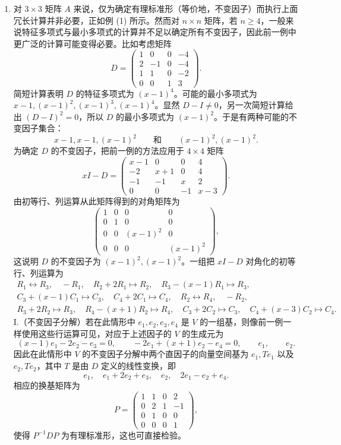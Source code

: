 \begin{enumerate}[label=(\arabic*)]
\item 对 $3\times3$ 矩阵 $A$ 来说，仅为确定有理标准形（等价地，不变因子）而执行上面冗长计算并非必要，正如例 (1) 所示。然而对 $n\times n$ 矩阵，若 $n\geq4$，一般来说特征多项式与最小多项式的计算并不足以确定所有不变因子，因此前一例中更广泛的计算可能变得必要。比如考虑矩阵
\[
D=\begin{pmatrix}
1&0&0&-4\\
2&-1&0&-4\\
1&1&0&-2\\
0&0&1&3
\end{pmatrix}.
\]
简短计算表明 $D$ 的特征多项式为 $(x-1)^4$。可能的最小多项式为 $x-1,(x-1)^2,(x-1)^3,(x-1)^4$。显然 $D-I\neq0$，另一次简短计算给出 $(D-I)^2=0$，所以 $D$ 的最小多项式为 $(x-1)^2$。于是有两种可能的不变因子集合：
\[
x-1,x-1,(x-1)^2
\qquad\text{和}\qquad
(x-1)^2,(x-1)^2.
\]
为确定 $D$ 的不变因子，把前一例的方法应用于 $4\times4$ 矩阵
\[
xI-D=\begin{pmatrix}
x-1&0&0&4\\
-2&x+1&0&4\\
-1&-1&x&2\\
0&0&-1&x-3
\end{pmatrix}.
\]
由初等行、列运算从此矩阵得到的对角矩阵为
\[
\begin{pmatrix}
1&0&0&0\\
0&1&0&0\\
0&0&(x-1)^2&0\\
0&0&0&(x-1)^2
\end{pmatrix},
\]
这说明 $D$ 的不变因子为 $(x-1)^2,(x-1)^2$。一组把 $xI-D$ 对角化的初等行、列运算为
\[
\begin{gathered}
R_1\leftrightarrow R_3,
\quad -R_1,
\quad R_2+2R_1\mapsto R_2,
\quad R_3-(x-1)R_1\mapsto R_3,\\
C_3+(x-1)C_1\mapsto C_3,
\quad C_4+2C_1\mapsto C_4,
\quad R_2\leftrightarrow R_4,
\quad -R_2,\\
R_3+2R_2\mapsto R_3,
\quad R_4-(x+1)R_2\mapsto R_4,
\quad C_3+2C_2\mapsto C_3,
\quad C_4+(x-3)C_2\mapsto C_4.
\end{gathered}
\]
I.（不变因子分解）若在此情形中 $e_1,e_2,e_3,e_4$ 是 $V$ 的一组基，则像前一例一样使用这些行运算可见，对应于上述因子的 $V$ 的生成元为
\[
(x-1)e_1-2e_2-e_3=0,
\qquad
-2e_1+(x+1)e_2-e_4=0,
\qquad
e_1,
\qquad
e_2.
\]
因此在此情形中 $V$ 的不变因子分解中两个直因子的向量空间基为 $e_1,Te_1$ 以及 $e_2,Te_2$，其中 $T$ 是由 $D$ 定义的线性变换，即
\[
e_1,
\quad e_1+2e_2+e_3,
\quad e_2,
\quad 2e_1-e_2+e_4.
\]
相应的换基矩阵为
\[
P=\begin{pmatrix}
1&1&0&2\\
0&2&1&-1\\
0&1&0&0\\
0&0&0&1
\end{pmatrix},
\]
使得 $P^{-1}DP$ 为有理标准形，这也可直接检验。


\end{enumerate}
